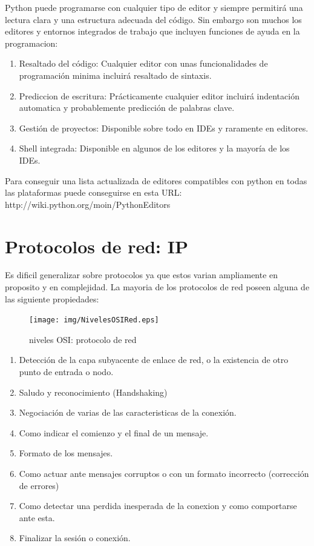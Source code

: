 \documentclass[a4paper,spanish,12pt]{book}
\begin{document}
Python puede programarse con cualquier tipo de editor y siempre permitirá una lectura clara y una estructura adecuada del código. Sin embargo son muchos los editores y entornos integrados de trabajo que incluyen funciones de ayuda en la programacion:
\begin{enumerate}
	\item{Resaltado del código: Cualquier editor con unas funcionalidades de programación minima incluirá resaltado de sintaxis.}
	\item{Prediccion de escritura: Prácticamente cualquier editor incluirá indentación automatica y probablemente predicción de palabras clave.}
	\item{Gestión de proyectos: Disponible sobre todo en IDEs y raramente en editores.}
	\item{Shell integrada: Disponible en algunos de los editores y la mayoría de los IDEs.}
\end{enumerate}

Para conseguir una lista actualizada de editores compatibles con python en todas las plataformas puede conseguirse en esta URL: 
http://wiki.python.org/moin/PythonEditors


\section{Protocolos de red: IP}
Es dificil generalizar sobre protocolos ya que estos varian ampliamente en proposito y en complejidad. La mayoria de los protocolos de red poseen alguna de las siguiente propiedades:

\begin{figure}
	\texttt{[image: img/NivelesOSIRed.eps]}	
              \caption{niveles OSI: protocolo de red}
  \label{fig:nivelesOSIRed}
\end{figure}


\begin{enumerate}
\item Detección de la capa subyacente de enlace de red, o la existencia de otro punto de entrada o nodo.
\item Saludo y reconocimiento (Handshaking)
\item Negociación de varias de las caracteristicas de la conexión.
\item Como indicar el comienzo y el final de un mensaje.
\item Formato de los mensajes.
\item Como actuar ante mensajes corruptos o con un formato incorrecto (corrección de errores)
\item Como detectar una perdida inesperada de la conexion y como comportarse ante esta.
\item Finalizar la sesión o conexión.
\end{enumerate}
\end{document}

